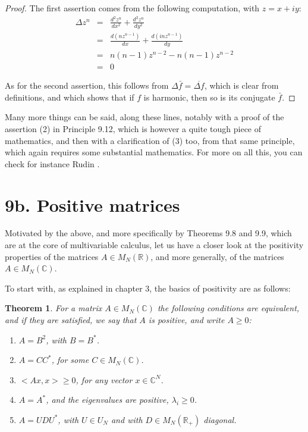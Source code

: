 \documentclass[12pt]{amsbook}
\newtheorem{theorem}{Theorem}[chapter]
\begin{document}
\begin{proof}
The first assertion comes from the following computation, with $z=x+iy$:
\begin{eqnarray*}
\Delta z^n
&=&\frac{d^2z^n}{dx^2}+\frac{d^2z^n}{dy^2}\\
&=&\frac{d(nz^{n-1})}{dx}+\frac{d(inz^{n-1})}{dy}\\
&=&n(n-1)z^{n-2}-n(n-1)z^{n-2}\\
&=&0
\end{eqnarray*}

As for the second assertion, this follows from $\Delta\bar{f}=\overline{\Delta f}$, which is clear from definitions, and which shows that if $f$ is harmonic, then so is its conjugate $\bar{f}$.
\end{proof}

Many more things can be said, along these lines, notably with a proof of the assertion (2) in Principle 9.12, which is however a quite tough piece of mathematics, and then with a clarification of (3) too, from that same principle, which again requires some substantial mathematics. For more on all this, you can check for instance Rudin \cite{ru2}.

\section*{9b. Positive matrices}

Motivated by the above, and more specifically by Theorems 9.8 and 9.9, which are at the core of multivariable calculus, let us have a closer look at the positivity properties of the matrices $A\in M_N(\mathbb R)$, and more generally, of the matrices $A\in M_N(\mathbb C)$. 

\bigskip

To start with, as explained in chapter 3, the basics of positivity are as follows:

\begin{theorem}
For a matrix $A\in M_N(\mathbb C)$ the following conditions are equivalent, and if they are satisfied, we say that $A$ is positive, and write $A\geq0$:
\begin{enumerate}
\item $A=B^2$, with $B=B^*$.

\item $A=CC^*$, for some $C\in M_N(\mathbb C)$.

\item $<Ax,x>\geq0$, for any vector $x\in\mathbb C^N$.

\item $A=A^*$, and the eigenvalues are positive, $\lambda_i\geq0$.

\item $A=UDU^*$, with $U\in U_N$ and with $D\in M_N(\mathbb R_+)$ diagonal.
\end{enumerate}
\end{theorem}
\end{document}
